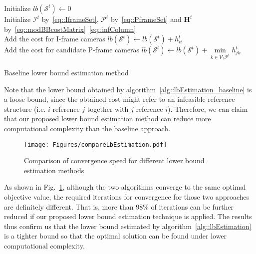 \begin{algorithm}[]
 \SetAlgoLined
 \BlankLine
 Initialize $lb(\mathcal{S}^t) \gets 0$\\
 Initialize $\mathcal{I}^t$ by~\eqref{eq::IframeSet}, $\mathcal{P}^t$ by~\eqref{eq::PframeSet} and $\mathbf{H}^t$ by~\eqref{eq::modBBcostMatrix}~\eqref{eq::infColumn} \\
 {
 	Add the cost for I-frame cameras $lb(\mathcal{S}^t) \gets lb(\mathcal{S}^t) + h_{ii}^t$ \\
 }
 {
 	Add the cost for candidate P-frame cameras $lb(\mathcal{S}^t) \gets lb(\mathcal{S}^t) + \underset{k \in V \setminus \mathcal{P}^t}{\min} h_{jk}^t$ \\
 }
 \caption{\label{alg::lbEstimation_baseline}Baseline lower bound estimation method}
\end{algorithm}
\DecMargin{1em}
%

Note that the lower bound obtained by algorithm~\ref{alg::lbEstimation_baseline} is a loose bound, since the obtained cost might refer to an infeasible reference structure (i.e. $i$ reference $j$ together with $j$ reference $i$).
Therefore, we can claim that our proposed lower bound estimation method can reduce more computational complexity than the baseline approach.
%
\begin{figure}
\begin{center}
\texttt{[image: Figures/compareLbEstimation.pdf]}
\caption{\label{fig::compareLbEstimation} Comparison of convergence speed for different lower bound estimation methods}
\end{center}
\end{figure}
%
As shown in Fig.~\ref{fig::compareLbEstimation}, although the two algorithms converge to the same optimal objective value, the required iterations for convergence for those two approaches are definitely different.
That is, more than $98\%$ of iterations can be further reduced if our proposed lower bound estimation technique is applied.
The results thus confirm us that the lower bound estimated by algorithm~\ref{alg::lbEstimation} is a tighter bound so that the optimal solution can be found under lower computational complexity.

